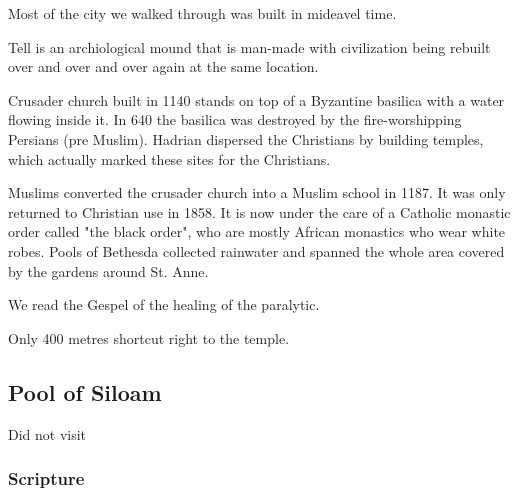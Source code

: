 \documentclass[letterpaper]{report}
\begin{document}
\begin{multicols}{2}
Most of the city we walked through was built in mideavel time.

Tell is an archiological mound that is man-made with civilization being rebuilt over and over and over again at the same location. 

Crusader church built in 1140 stands on top of a Byzantine basilica with a water flowing inside it. In 640 the basilica was destroyed by the fire-worshipping Persians (pre Muslim).
Hadrian dispersed the Christians by building temples, which actually marked these sites for the Christians.

Muslims converted the crusader church into a Muslim school in 1187. It was only returned to Christian use in 1858. It is now under the care of a Catholic monastic order called "the black order", who are mostly African monastics who wear white robes.
Pools of Bethesda collected rainwater and spanned the whole area covered by the gardens around St. Anne.

We read the Gespel of the healing of the paralytic.

Only 400 metres shortcut right to the temple.

\end{multicols}

\clearpage
\subsection{Pool of Siloam}
\begin{multicols}{2}
	\mbox{}
 Did not visit
\end{multicols}
\subsubsection{Scripture}
\end{document}
